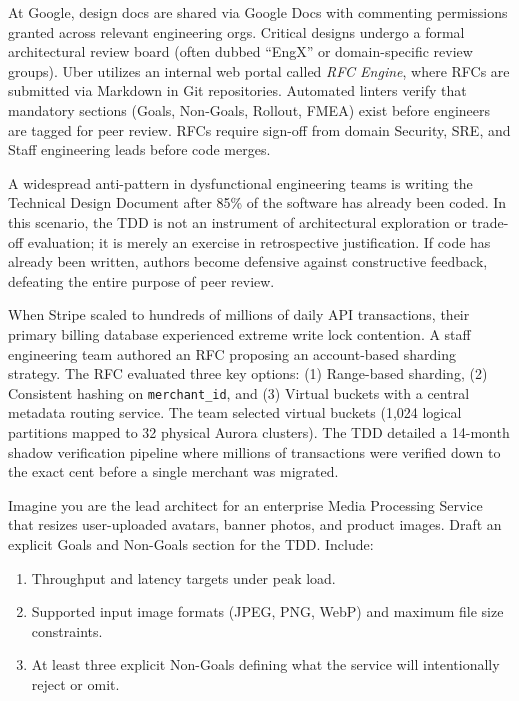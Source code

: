 \begin{underthehoodbox}
At Google, design docs are shared via Google Docs with commenting permissions granted across relevant engineering orgs. Critical designs undergo a formal architectural review board (often dubbed ``EngX'' or domain-specific review groups). Uber utilizes an internal web portal called \textit{RFC Engine}, where RFCs are submitted via Markdown in Git repositories. Automated linters verify that mandatory sections (Goals, Non-Goals, Rollout, FMEA) exist before engineers are tagged for peer review. RFCs require sign-off from domain Security, SRE, and Staff engineering leads before code merges.
\end{underthehoodbox}

\begin{commonmistakebox}
A widespread anti-pattern in dysfunctional engineering teams is writing the Technical Design Document after 85\% of the software has already been coded. In this scenario, the TDD is not an instrument of architectural exploration or trade-off evaluation; it is merely an exercise in retrospective justification. If code has already been written, authors become defensive against constructive feedback, defeating the entire purpose of peer review.
\end{commonmistakebox}

\begin{realworldbox}
When Stripe scaled to hundreds of millions of daily API transactions, their primary billing database experienced extreme write lock contention. A staff engineering team authored an RFC proposing an account-based sharding strategy. The RFC evaluated three key options: (1) Range-based sharding, (2) Consistent hashing on \texttt{merchant\_id}, and (3) Virtual buckets with a central metadata routing service. The team selected virtual buckets (1,024 logical partitions mapped to 32 physical Aurora clusters). The TDD detailed a 14-month shadow verification pipeline where millions of transactions were verified down to the exact cent before a single merchant was migrated.
\end{realworldbox}

\begin{tryityourselfbox}
Imagine you are the lead architect for an enterprise Media Processing Service that resizes user-uploaded avatars, banner photos, and product images. Draft an explicit Goals and Non-Goals section for the TDD. Include:
\begin{enumerate}
  \item Throughput and latency targets under peak load.
  \item Supported input image formats (JPEG, PNG, WebP) and maximum file size constraints.
  \item At least three explicit Non-Goals defining what the service will intentionally reject or omit.
\end{enumerate}
\end{tryityourselfbox}

